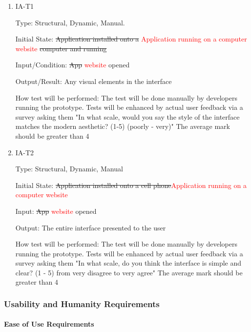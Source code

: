 \documentclass[12pt, titlepage]{article}
\begin{document}
\begin{enumerate}

\item{IA-T1\\}

Type: Structural, Dynamic, Manual.
					
Initial State: \sout{Application installed onto a }\textcolor{red}{Application running on a computer website} \sout{computer and running}
					
Input/Condition: \sout{App} \textcolor{red}{website} opened
					
Output/Result: Any visual elements in the interface
					
How test will be performed: The test will be done manually by developers running the prototype. Tests will be enhanced by actual user feedback via a survey asking them "In what scale, would you say the style of the interface matches the modern aesthetic? (1-5) (poorly - very)" The average mark should be greater than 4
					
\item{IA-T2\\}

Type: Structural, Dynamic, Manual
					
Initial State: \sout{Application installed onto a cell phone}\textcolor{red}{Application running on a computer website}
					
Input: \sout{App} \textcolor{red}{website} opened
					
Output: The entire interface presented to the user
					
How test will be performed: The test will be done manually by developers running the prototype. Tests will be enhanced by actual user feedback via a survey asking them "In what scale, do you think the interface is simple and clear? (1 - 5) from very disagree to very agree" The average mark should be greater than 4

\end{enumerate}

\subsubsection{Usability and Humanity Requirements}
		
\paragraph{Ease of Use Requirements}
\end{document}
